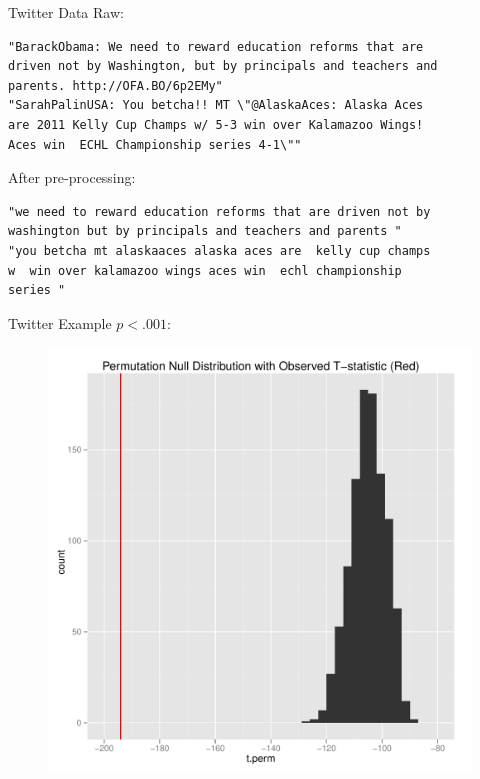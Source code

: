 \documentclass{beamer}
\begin{document}
\begin{frame}[fragile]{Twitter Data}
  Raw: 
\begin{verbatim}
"BarackObama: We need to reward education reforms that are 
driven not by Washington, but by principals and teachers and
parents. http://OFA.BO/6p2EMy"
"SarahPalinUSA: You betcha!! MT \"@AlaskaAces: Alaska Aces 
are 2011 Kelly Cup Champs w/ 5-3 win over Kalamazoo Wings! 
Aces win  ECHL Championship series 4-1\""
\end{verbatim}
  After pre-processing:
\begin{verbatim}
"we need to reward education reforms that are driven not by 
washington but by principals and teachers and parents "
"you betcha mt alaskaaces alaska aces are  kelly cup champs 
w  win over kalamazoo wings aces win  echl championship 
series "
\end{verbatim}
\end{frame}

\begin{frame}{Twitter Example}
  $p < .001$:
    \begin{figure}[!ht]
   \centering
   \includegraphics[scale=.4]{pres6.pdf}  
 \end{figure}
\end{frame}
\end{document}
